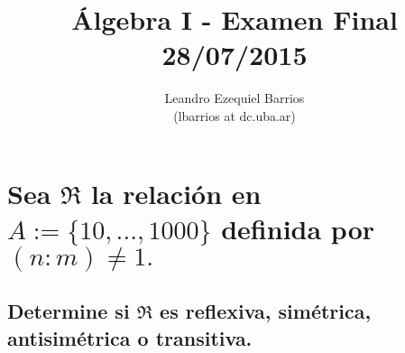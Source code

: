 \documentclass[a4paper,spanish]{article}
\begin{document}
\title{Álgebra I - Examen Final\\28/07/2015}
\author{\small Leandro Ezequiel Barrios \\ \footnotesize(lbarrios at dc.uba.ar)}
\date{}
\maketitle

\newpage
\section{%
  Sea $\mathfrak{R}$ la relación en $A := \{10, ..., 1000\}$ %
  definida por $(n:m) \neq 1.$%
}
  \subsection{%
    Determine si $\mathfrak{R}$ es reflexiva, simétrica, antisimétrica %
    o transitiva.%
  }
\end{document}

